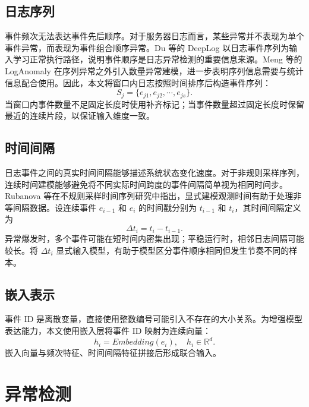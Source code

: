 \subsection{日志序列}

事件频次无法表达事件先后顺序。对于服务器日志而言，某些异常并不表现为单个事件异常，而表现为事件组合顺序异常。Du 等的 DeepLog 以日志事件序列为输入学习正常执行路径，说明事件顺序是日志异常检测的重要信息来源\cite{du2017deeplog}。Meng 等的 LogAnomaly 在序列异常之外引入数量异常建模，进一步表明序列信息需要与统计信息配合使用\cite{meng2019loganomaly}。因此，本文将窗口内日志按照时间排序后构造事件序列：
\begin{equation}
    S_j=\{e_{j1},e_{j2},\cdots,e_{js}\}.
\end{equation}
当窗口内事件数量不足固定长度时使用补齐标记；当事件数量超过固定长度时保留最近的连续片段，以保证输入维度一致。

\subsection{时间间隔}

日志事件之间的真实时间间隔能够描述系统状态变化速度。对于非规则采样序列，连续时间建模能够避免将不同实际时间跨度的事件间隔简单视为相同时间步。Rubanova 等在不规则采样时间序列研究中指出，显式建模观测时间有助于处理非等间隔数据\cite{rubanova2019latentode}。设连续事件 $e_{i-1}$ 和 $e_i$ 的时间戳分别为 $t_{i-1}$ 和 $t_i$，其时间间隔定义为
\begin{equation}
    \Delta t_i=t_i-t_{i-1}.
\end{equation}
异常爆发时，多个事件可能在短时间内密集出现；平稳运行时，相邻日志间隔可能较长。将 $\Delta t_i$ 显式输入模型，有助于模型区分事件顺序相同但发生节奏不同的样本。

\subsection{嵌入表示}

事件 ID 是离散变量，直接使用整数编号可能引入不存在的大小关系。为增强模型表达能力，本文使用嵌入层将事件 ID 映射为连续向量：
\begin{equation}
    h_i=Embedding(e_i), \quad h_i\in\mathbb{R}^{d}.
\end{equation}
嵌入向量与频次特征、时间间隔特征拼接后形成联合输入。

\section{异常检测}

